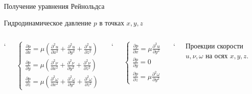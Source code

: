 \documentclass[ignoreonframetext,unicode]{beamer}
\begin{document}
	\begin{frame}{Получение уравнения Рейнольдса}
		\vspace*{-2mm}
	\begin{block}{Гидродинамическое давление $p$ в
			точках $x, y, z$}
		\vspace*{-6mm}
		\begin{columns}
		`	
			\begin{minipage}[t]{0.5\linewidth}
			\begin{equation*}
				\label{eqfi}
				\begin{cases}
					\frac{\partial p}{\partial x} = \mu \left( \frac{\partial^2 u}{\partial x^2} + \frac{\partial^2 u}{\partial y^2} + \frac{\partial^2 u}{\partial z^2} \right) \\
					\frac{\partial p}{\partial y} = \mu \left( \frac{\partial^2 \nu}{\partial x^2} + \frac{\partial^2 \nu}{\partial y^2} + \frac{\partial^2 \nu}{\partial z^2} \right) \\
					\frac{\partial p}{\partial z} = \mu \left( \frac{\partial^2 \omega}{\partial x^2} + \frac{\partial^2 \omega}{\partial y^2} + \frac{\partial^2 \omega}{\partial z^2} \right)
				\end{cases}
			\end{equation*}
			\end{minipage}
				
				
				`
					\begin{minipage}[t]{0.2\linewidth}
		
		
					\begin{equation*}
					\label{secondinitialeq}
					\begin{cases}
						\frac{\partial p }{\partial x} = \mu \frac{\partial^2 u}{\partial y^2} \\
						\frac{\partial p }{\partial y} = 0 \\
						\frac{\partial p }{\partial z} = \mu \frac{\partial^2 \omega}{\partial y^2}
					\end{cases}
				\end{equation*}
			\end{minipage}
				
				`
				
			\begin{minipage}[t]{0.6\linewidth}
				Проекции скорости $u, \nu, \omega$ на осях $x, y, z$.
			\end{minipage}
				

\end{columns}
\end{block}
\end{frame}
\end{document}
